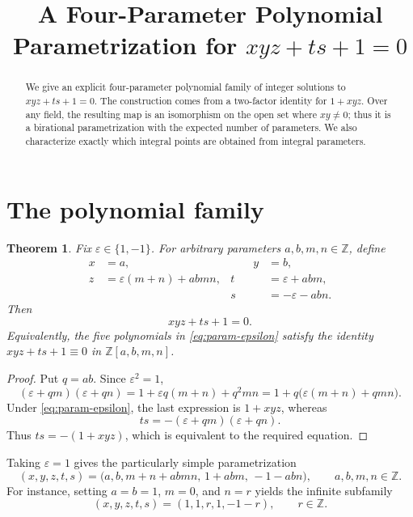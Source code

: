 \documentclass[11pt]{article}
\title{A Four-Parameter Polynomial Parametrization for
\texorpdfstring{\(xyz+ts+1=0\)}{xyz+ts+1=0}}
\author{}
\date{}
\newtheorem{theorem}{Theorem}
\theoremstyle{remark}
\newcommand{\Z}{\mathbb Z}
\begin{document}
\maketitle
\vspace{-2.5em}

\begin{abstract}
We give an explicit four-parameter polynomial family of integer solutions to
\(xyz+ts+1=0\).  The construction comes from a two-factor identity for
\(1+xyz\).  Over any field, the resulting map is an isomorphism on the open
set where \(xy\neq0\); thus it is a birational parametrization with the
expected number of parameters.  We also characterize exactly which integral
points are obtained from integral parameters.
\end{abstract}

\section{The polynomial family}

\begin{theorem}\label{thm:main}
Fix \(\varepsilon\in\{1,-1\}\).  For arbitrary parameters
\(a,b,m,n\in\Z\), define
\begin{equation}\label{eq:param-epsilon}
\begin{aligned}
 x&=a, &\qquad y&=b,\\
 z&=\varepsilon(m+n)+abmn, &
 t&=\varepsilon+abm,\\
 &&s&=-\varepsilon-abn.
\end{aligned}
\end{equation}
Then
\[
xyz+ts+1=0.
\]
Equivalently, the five polynomials in \eqref{eq:param-epsilon} satisfy the
identity \(xyz+ts+1\equiv0\) in \(\Z[a,b,m,n]\).
\end{theorem}

\begin{proof}
Put \(q=ab\).  Since \(\varepsilon^2=1\),
\begin{equation}\label{eq:keyidentity}
(\varepsilon+qm)(\varepsilon+qn)
 =1+\varepsilon q(m+n)+q^2mn
 =1+q\bigl(\varepsilon(m+n)+qmn\bigr).
\end{equation}
Under \eqref{eq:param-epsilon}, the last expression is \(1+xyz\), whereas
\[
ts=-(\varepsilon+qm)(\varepsilon+qn).
\]
Thus \(ts=-(1+xyz)\), which is equivalent to the required equation.
\end{proof}

Taking \(\varepsilon=1\) gives the particularly simple parametrization
\begin{equation}\label{eq:main-param}
\boxed{
(x,y,z,t,s)
 =\bigl(a,b,m+n+abmn,\,1+abm,\,-1-abn\bigr),
\qquad a,b,m,n\in\Z.
}
\end{equation}
For instance, setting \(a=b=1\), \(m=0\), and \(n=r\) yields the infinite
subfamily
\[
(x,y,z,t,s)=(1,1,r,1,-1-r),\qquad r\in\Z.
\]
\end{document}
